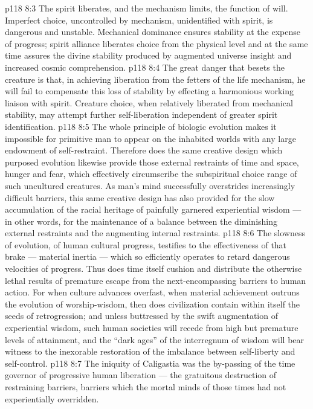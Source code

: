 \vs p118 8:3 \pc The spirit liberates, and the mechanism limits, the function of will. Imperfect choice, uncontrolled by mechanism, unidentified with spirit, is dangerous and unstable. Mechanical dominance ensures stability at the expense of progress; spirit alliance liberates choice from the physical level and at the same time assures the divine stability produced by augmented universe insight and increased cosmic comprehension.
\vs p118 8:4 The great danger that besets the creature is that, in achieving liberation from the fetters of the life mechanism, he will fail to compensate this loss of stability by effecting a harmonious working liaison with spirit. Creature choice, when relatively liberated from mechanical stability, may attempt further self\hyp{}liberation independent of greater spirit identification.
\vs p118 8:5 The whole principle of biologic evolution makes it impossible for primitive man to appear on the inhabited worlds with any large endowment of self\hyp{}restraint. Therefore does the same creative design which purposed evolution likewise provide those external restraints of time and space, hunger and fear, which effectively circumscribe the subspiritual choice range of such uncultured creatures. As man’s mind successfully overstrides increasingly difficult barriers, this same creative design has also provided for the slow accumulation of the racial heritage of painfully garnered experiential wisdom --- in other words, for the maintenance of a balance between the diminishing external restraints and the augmenting internal restraints.
\vs p118 8:6 The slowness of evolution, of human cultural progress, testifies to the effectiveness of that brake --- material inertia --- which so efficiently operates to retard dangerous velocities of progress. Thus does time itself cushion and distribute the otherwise lethal results of premature escape from the next\hyp{}encompassing barriers to human action. For when culture advances overfast, when material achievement outruns the evolution of worship\hyp{}wisdom, then does civilization contain within itself the seeds of retrogression; and unless buttressed by the swift augmentation of experiential wisdom, such human societies will recede from high but premature levels of attainment, and the “dark ages” of the interregnum of wisdom will bear witness to the inexorable restoration of the imbalance between self\hyp{}liberty and self\hyp{}control.
\vs p118 8:7 The iniquity of Caligastia was the by\hyp{}passing of the time governor of progressive human liberation --- the gratuitous destruction of restraining barriers, barriers which the mortal minds of those times had not experientially overridden.
